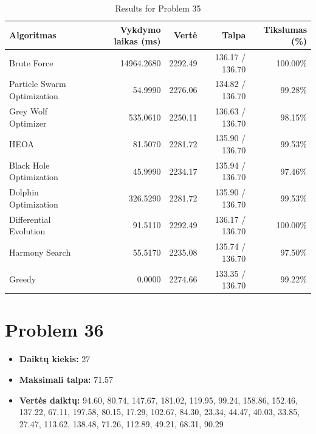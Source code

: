 \documentclass[a4paper,11pt]{article}
\begin{document}
\begin{table}[h!]
\centering
\begin{tabular}{lrrrr}
\toprule
\textbf{Algoritmas} & \textbf{Vykdymo laikas (ms)} & \textbf{Vertė} & \textbf{Talpa} & \textbf{Tikslumas (\%)} \\
\midrule
Brute Force & 14964.2680 & 2292.49 & 136.17 / 136.70 & 100.00\% \\
Particle Swarm Optimization & 54.9990 & 2276.06 & 134.82 / 136.70 & 99.28\% \\
Grey Wolf Optimizer & 535.0610 & 2250.11 & 136.63 / 136.70 & 98.15\% \\
HEOA & 81.5070 & 2281.72 & 135.90 / 136.70 & 99.53\% \\
Black Hole Optimization & 45.9990 & 2234.17 & 135.94 / 136.70 & 97.46\% \\
Dolphin Optimization & 326.5290 & 2281.72 & 135.90 / 136.70 & 99.53\% \\
Differential Evolution & 91.5110 & 2292.49 & 136.17 / 136.70 & 100.00\% \\
Harmony Search & 55.5170 & 2235.08 & 135.74 / 136.70 & 97.50\% \\
Greedy & 0.0000 & 2274.66 & 133.35 / 136.70 & 99.22\% \\
\bottomrule
\end{tabular}
\caption{Results for Problem 35}
\end{table}
\clearpage

\section*{Problem 36}
\begin{itemize}
    \item \textbf{Daiktų kiekis:} 27
    \item \textbf{Maksimali talpa:} 71.57
    \item \textbf{Vertės daiktų:} 94.60, 80.74, 147.67, 181.02, 119.95, 99.24, 158.86, 152.46, 137.22, 67.11, 197.58, 80.15, 17.29, 102.67, 84.30, 23.34, 44.47, 40.03, 33.85, 27.47, 113.62, 138.48, 71.26, 112.89, 49.21, 68.31, 90.29
\end{itemize}
\end{document}
